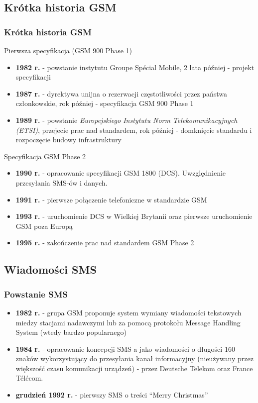 \documentclass[xcolor=table]{beamer}
\begin{document}
\subsection{Krótka historia GSM}
\begin{frame}[allowframebreaks]
  \frametitle{Krótka historia GSM}

  Pierwsza specyfikacja (GSM 900 Phase 1)
  \begin{itemize}
    \item \textbf{1982 r.} - powstanie instytutu Groupe Spécial Mobile, 2 lata
      później - projekt specyfikacji
    \item \textbf{1987 r.} - dyrektywa unijna o rezerwacji częstotliwości przez
      państwa członkowskie, rok później - specyfikacja GSM 900 Phase 1
    \item \textbf{1989 r.} - powstanie \emph{Europejskiego Instytutu Norm
      Telekomunikacyjnych (ETSI)}, przejecie prac nad standardem, rok później -
      domknięcie standardu i rozpoczęcie budowy infrastruktury
  \end{itemize}

  \framebreak

  Specyfikacja GSM Phase 2
  \begin{itemize}
    \item \textbf{1990 r.} - opracowanie specyfikacji GSM 1800 (DCS).
      Uwzględnienie przesyłania SMS-ów i danych.
    \item \textbf{1991 r.} - pierwsze połączenie telefoniczne w standardzie GSM
    \item \textbf{1993 r.} - uruchomienie DCS w Wielkiej Brytanii oraz pierwsze
      uruchomienie GSM poza Europą
    \item \textbf{1995 r.} - zakończenie prac nad standardem GSM Phase 2
  \end{itemize}
\end{frame}

\subsection{Wiadomości SMS}

\begin{frame}
  \frametitle{Powstanie SMS}

  \begin{itemize}
    \item \textbf{1982 r.} - grupa GSM proponuje system wymiany wiadomości
      tekstowych miedzy stacjami nadawczymi lub za pomocą protokołu Message
      Handling System (wtedy bardzo popularnego)
    \item \textbf{1984 r.} - opracowanie koncepcji SMS-a jako wiadomości o
      długości 160 znaków wykorzystujący do przesyłania kanał informacyjny
      (nieużywany przez większość czasu komunikacji urządzeń) - przez Deutsche
      Telekom oraz France Télécom.
    \item \textbf{grudzień 1992 r.} - pierwszy SMS o treści ``Merry
      Christmas''
  \end{itemize}
\end{frame}
\end{document}

